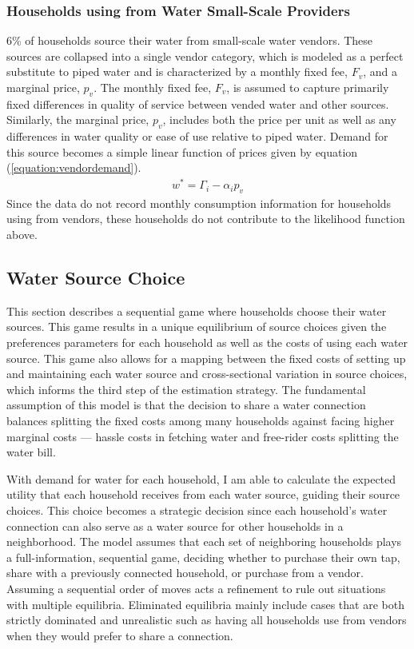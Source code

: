\documentclass[12pt]{article}
\begin{document}
\subsubsection{Households using from Water Small-Scale Providers}

6\unskip\% of households source their water from small-scale water vendors.  These sources are collapsed into a single vendor category, which is modeled as a perfect substitute to piped water and is characterized by a monthly fixed fee, $F_v$, and a marginal price, $p_v$.  The monthly fixed fee, $F_v$, is assumed to capture primarily fixed differences in quality of service between vended water and other sources.  Similarly, the marginal price, $p_v$, includes both the price per unit as well as any differences in water quality or ease of use relative to piped water.  Demand for this source becomes a simple linear function of prices given by equation (\ref{equation:vendordemand}).
\begin{align}\label{equation:vendordemand}
w^{*} = \Gamma_i - \alpha_i p_v
\end{align}
Since the data do not record monthly consumption information for households using from vendors, these households do not contribute to the likelihood function above.  



\subsection{Water Source Choice}\label{section:watersourcechoice}

This section describes a sequential game where households choose their water sources.  This game results in a unique equilibrium of source choices given the preferences parameters for each household as well as the costs of using each water source.  This game also allows for a mapping between the fixed costs of setting up and maintaining each water source and cross-sectional variation in source choices, which informs the third step of the estimation strategy.  The fundamental assumption of this model is that the decision to share a water connection balances splitting the fixed costs among many households against facing higher marginal costs --- hassle costs in fetching water and free-rider costs splitting the water bill.

With demand for water for each household, I am able to calculate the expected utility that each household receives from each water source, guiding their source choices.  This choice becomes a strategic decision since each household's water connection can also serve as a water source for other households in a neighborhood.  The model assumes that each set of neighboring households plays a full-information, sequential game, deciding whether to purchase their own tap, share with a previously connected household, or purchase from a vendor.  Assuming a sequential order of moves acts a refinement to rule out situations with multiple equilibria.  Eliminated equilibria mainly include cases that are both strictly dominated and unrealistic such as having all households use from vendors when they would prefer to share a connection.
\end{document}

